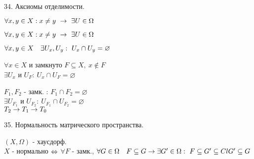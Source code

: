 \documentclass[11pt, fleqn]{article}
\begin{document}
    \begin{question}{34. Аксиомы отделимости.}
        \begin{theorem} [Колмогорова]
            $\forall x, y \in X: x \neq y \ \ra \ \exists U \in \Omega$
        \end{theorem}

        \begin{theorem} [Тихонова]
            $\forall x, y \in X: x \neq y \ \ra \ \exists U \in \Omega$
        \end{theorem}

        \begin{theorem} [Хаусдорфа]
            $\forall x, y \in X \q \exists U_x, U_y: \ U_x \cap U_y = \varnothing$
        \end{theorem}

        \begin{theorem} [3]
            $\forall x \in X$ и замкнуто $F \subseteq X, \  x \not \in F$\\
            $\exists U_x$ и $U_F : \ U_x \cap U_F = \varnothing$
        \end{theorem}

        \begin{theorem} [4]
            $F_1, F_2$ - замк. : $F_1 \cap F_2 = \varnothing$\\
            $\exists U_{F_1}$ и $U_{F_2}: \ U_{F_1} \cap U_{F_2} = \varnothing$\\
            $T_2 \rightarrow T_1 \rightarrow T_0$
        \end{theorem}
    \end{question}

    \begin{question}{35. Нормальность матрического пространства.}
        \begin{definition}
            $(X, \Omega)$ - хаусдорф.\\
            $X$ - нормально $\Leftrightarrow$ $\forall F$ - замк., $\forall G \in \Omega \quad F \subseteq G \rightarrow
            \exists G' \in \Omega:\\ \ F \subseteq G' \subseteq Cl G' \subseteq G$
        \end{definition}
    \end{question}
\end{document}
